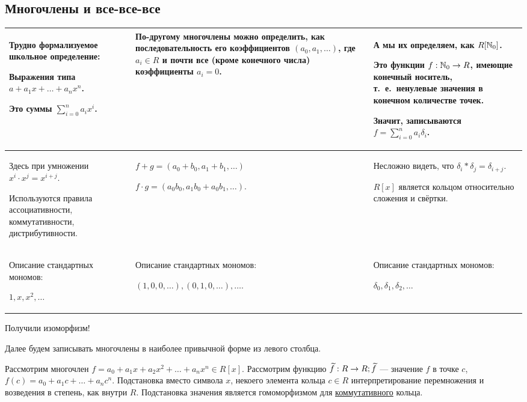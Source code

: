 \documentclass[a4paper]{report}
\begin{document}
    \subsection{Многочлены и все-все-все}
    \begin{tabular}{|p{}|p{}|p{}|}
        \hline
        Трудно формализуемое школьное определение:

        Выражения типа $a + a_1 x + \dots + a_n x^n$.

        Это суммы $\sum\limits_{i = 0}^n a_i x^i$.
        &
        По-другому многочлены можно определить, как последовательность его коэффициентов $(a_0, a_1, \dots)$, где $a_i \in R$ и почти все (кроме конечного числа) коэффициенты $a_i = 0$.
        &
        А мы их определяем, как $R[\mathbb{N}_0]$.

        Это функции $f : \mathbb{N}_0 \rightarrow R$, имеющие конечный носитель, т.\ е.\ ненулевые значения в конечном количестве точек.

        Значит, записываются $f = \sum\limits_{i = 0}^n a_i \delta_i$. \\
        \hline
        Здесь при умножении $x^i \cdot x^j = x^{i + j}$.

        Используются правила ассоциативности, коммутативности, дистрибутивности.
        &
        $f + g = (a_0 + b_0, a_1 + b_1,\dots)$

        $f \cdot g = (a_0 b_0, a_1 b_0 + a_0 b_1,\dots)$.
        &
        Несложно видеть, что $\delta_i * \delta_j = \delta_{i + j}$.

        $R[x]$ является кольцом относительно сложения и свёртки.
        \\
        \hline
        Описание стандартных мономов:

        $1, x, x^2, \dots$ &

        Описание стандартных мономов:

        $(1, 0, 0, \dots), (0, 1, 0, \dots), \dots$.
        &
        Описание стандартных мономов:

        $\delta_0, \delta_1, \delta_2, \dots$ \\
        \hline
    \end{tabular}
    Получили изоморфизм!

    Далее будем записывать многочлены в наиболее привычной форме из левого столбца.

    Рассмотрим многочлен $f = a_0 + a_1 x + a_2 x^2 + \dots + a_n x^n \in R[x]$.
    Рассмотрим функцию $\widetilde{f} : R \rightarrow R; \widetilde{f}$ --- значение $f$ в точке $c$, $f(c) = a_0 + a_1 c + \dots + a_n c^n$.
    Подстановка вместо символа $x$, некоего элемента кольца $c \in R$ интерпретирование перемножения и возведения в степень, как внутри $R$.
    Подстановка значения является гомоморфизмом для \underline{коммутативного} кольца.
\end{document}
